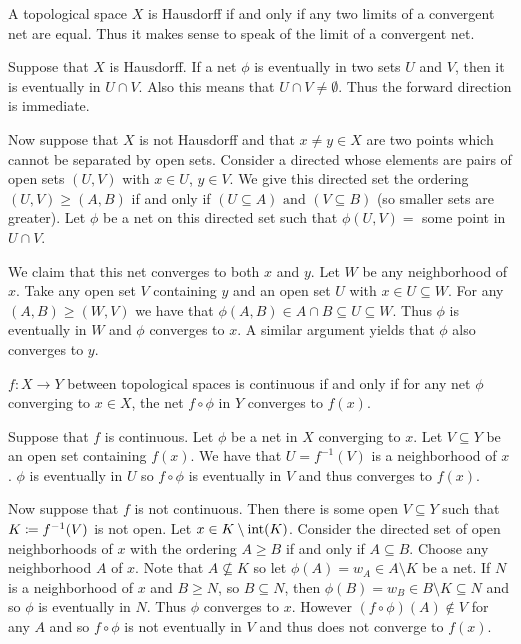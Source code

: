 \documentclass[letterpaper, 11pt, oneside]{book}
\begin{document}
\begin{prop}
  A topological space $X$ is Hausdorff if and only if any two limits of a convergent net are equal.
  Thus it makes sense to speak of the limit of a convergent net.
\end{prop}
\begin{pf}
  Suppose that $X$ is Hausdorff.
  If a net $\phi$ is eventually in two sets $U$ and $V$, then it is eventually in $U \cap V$.
  Also this means that $U \cap V \neq \emptyset$.
  Thus the forward direction is immediate.

  Now suppose that $X$ is not Hausdorff and that $x \neq y \in X$ are two points which cannot be separated by open sets.
  Consider a directed whose elements are pairs of open sets $(U, V)$ with $x \in U$, $y \in V$.
  We give this directed set the ordering $(U, V) \geq (A, B)$ if and only if $(U \subseteq A) \text{ and } (V \subseteq B)$ (so smaller sets are greater).
  Let $\phi$ be a net on this directed set such that $\phi(U, V) = $ some point in $U \cap V$.

  We claim that this net converges to both $x$ and $y$.
  Let $W$ be any neighborhood of $x$.
  Take any open set $V$ containing $y$ and an open set $U$ with $x \in U \subseteq W$.
  For any $(A, B) \geq (W, V)$ we have that $\phi(A, B) \in A \cap B \subseteq U \subseteq W$.
  Thus $\phi$ is eventually in $W$ and $\phi$ converges to $x$.
  A similar argument yields that $\phi$ also converges to $y$.
\end{pf}

\begin{prop}\label{prop: continuous_iff_net_converges}
  $f\colon X \to Y$ between topological spaces is continuous if and only if for any net $\phi$ converging to $x \in X$, the net $f \circ \phi$ in $Y$ converges to $f(x)$.
\end{prop}
\begin{pf}
  Suppose that $f$ is continuous.
  Let $\phi$ be a net in $X$ converging to $x$.
  Let $V \subseteq Y$ be an open set containing $f(x)$.
  We have that $U = f^{-1}(V)$ is a neighborhood of $x$.
  $\phi$ is eventually in $U$ so $f \circ \phi$ is eventually in $V$ and thus converges to $f(x)$.

  Now suppose that $f$ is not continuous.
  Then there is some open $V \subseteq Y$ such that $K \coloneqq f^{-1}(V)$ is not open.
  Let $x \in K \setminus \operatorname{int}(K)$.
  Consider the directed set of open neighborhoods of $x$ with the ordering $A \geq B$ if and only if $A \subseteq B$.
  Choose any neighborhood $A$ of $x$.
  Note that $A \not\subseteq K$ so let $\phi(A) = w_{A} \in A \setminus K$ be a net.
  If $N$ is a neighborhood of $x$ and $B \geq N$, so $B \subseteq N$, then $\phi(B) = w_{B} \in B \setminus K \subseteq N$ and so $\phi$ is eventually in $N$.
  Thus $\phi$ converges to $x$.
  However $(f \circ \phi)(A) \notin V$ for any $A$ and so $f \circ \phi$ is not eventually in $V$ and thus does not converge to $f(x)$.
\end{pf}
\end{document}
